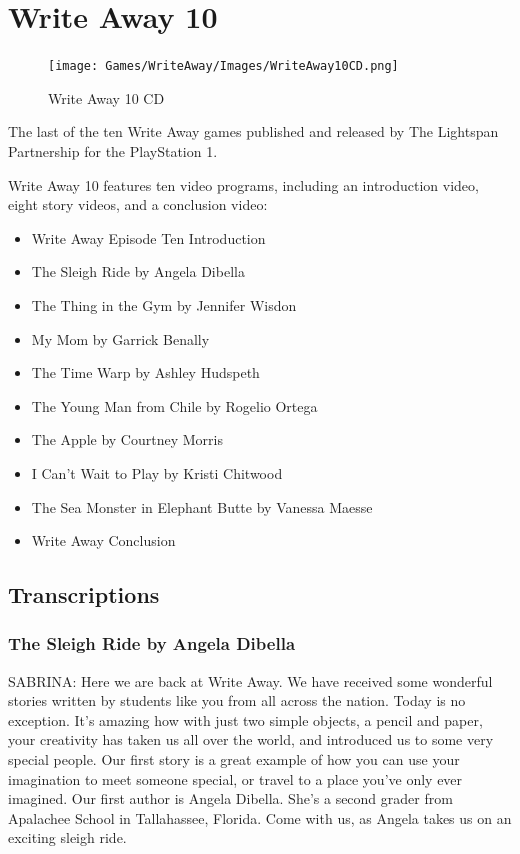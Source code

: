 \chapter{Write Away 10}

\begin{figure}[H]
    \centering
    \texttt{[image: Games/WriteAway/Images/WriteAway10CD.png]}
    \caption{Write Away 10 CD}
\end{figure}

The last of the ten Write Away games published and released by The Lightspan Partnership for the PlayStation 1.

Write Away 10 features ten video programs, including an introduction video, eight story videos, and a conclusion video:

\begin{itemize}
    \item Write Away Episode Ten Introduction
    \item The Sleigh Ride by Angela Dibella
    \item The Thing in the Gym by Jennifer Wisdon
    \item My Mom by Garrick Benally
    \item The Time Warp by Ashley Hudspeth
    \item The Young Man from Chile by Rogelio Ortega
    \item The Apple by Courtney Morris
    \item I Can't Wait to Play by Kristi Chitwood
    \item The Sea Monster in Elephant Butte by Vanessa Maesse
    \item Write Away Conclusion
\end{itemize}

\clearpage
\newpage

\section{Transcriptions}

\subsection{The Sleigh Ride by Angela Dibella}

SABRINA:
Here we are back at Write Away.
We have received some wonderful stories written by students like you from all across the nation.
Today is no exception.
It's amazing how with just two simple objects, a pencil and paper, your creativity has taken us all over the world, and introduced us to some very special people.
Our first story is a great example of how you can use your imagination to meet someone special, or travel to a place you've only ever imagined.
Our first author is Angela Dibella.
She's a second grader from Apalachee School in Tallahassee, Florida.
Come with us, as Angela takes us on an exciting sleigh ride.

